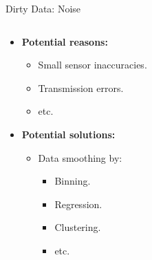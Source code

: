 \begin{frame}{Dirty Data: Noise}
	\begin{columns}
		\begin{column}{0.45\textwidth}
			\begin{itemize}
				\item \textbf{Potential reasons:}
				      \begin{itemize}
					      \item Small sensor inaccuracies.
					      \item Transmission errors.
					      \item etc.
				      \end{itemize}
				\item \textbf{Potential solutions:}
				      \begin{itemize}
					      \item Data smoothing by:
					            \begin{itemize}
						            \item Binning.
						            \item Regression.
						            \item Clustering.
						            \item etc.
					            \end{itemize}
				      \end{itemize}
			\end{itemize}
		\end{column}

		\begin{column}{0.45\textwidth}
			\centering

			\vspace*{1cm}



\end{column}
\end{columns}
\end{frame}
